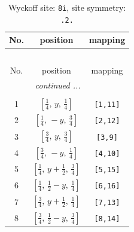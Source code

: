 \documentclass[fleqn,8pt]{jsarticle}
\begin{document}
\begin{longtable}{ccc}
\caption{Wyckoff site: {\tt 8i}, site symmetry: {\tt .2.}}
 \\
 \hline \hline
No. & position & mapping \\ \hline \endfirsthead

\multicolumn{2}{l}{\tablename\ \thetable{}} \\
 \hline \hline
No. & position & mapping \\ \hline \endhead

 \hline \hline
\multicolumn{2}{r}{\footnotesize\it continued ...} \\ \endfoot

 \hline \hline
\multicolumn{2}{r}{} \\ \endlastfoot

1 & $\left[ \frac{1}{4},\, y,\, \frac{1}{4} \right]$ & {\tt [1,11]} \\ \hline
2 & $\left[ \frac{1}{4},\, - y,\, \frac{3}{4} \right]$ & {\tt [2,12]} \\ \hline
3 & $\left[ \frac{3}{4},\, y,\, \frac{3}{4} \right]$ & {\tt [3,9]} \\ \hline
4 & $\left[ \frac{3}{4},\, - y,\, \frac{1}{4} \right]$ & {\tt [4,10]} \\ \hline
5 & $\left[ \frac{1}{4},\, y + \frac{1}{2},\, \frac{3}{4} \right]$ & {\tt [5,15]} \\ \hline
6 & $\left[ \frac{1}{4},\, \frac{1}{2} - y,\, \frac{1}{4} \right]$ & {\tt [6,16]} \\ \hline
7 & $\left[ \frac{3}{4},\, y + \frac{1}{2},\, \frac{1}{4} \right]$ & {\tt [7,13]} \\ \hline
8 & $\left[ \frac{3}{4},\, \frac{1}{2} - y,\, \frac{3}{4} \right]$ & {\tt [8,14]} \\
\end{longtable}
\renewcommand{\arraystretch}{1.2}
\end{document}
